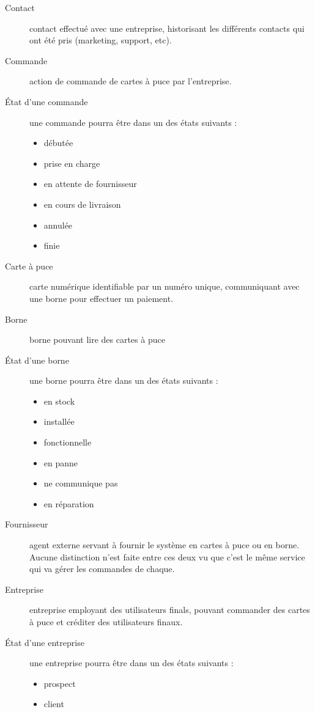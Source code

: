 \begin{description}
  \item[Contact] contact effectué avec une entreprise, historisant les
    différents contacts qui ont été pris (marketing, support, etc).
  \item[Commande] action de commande de cartes à puce par l'entreprise.
  \item[État d'une commande] une commande pourra être dans un des états
    suivants :
    \begin{itemize}
      \item débutée
      \item prise en charge
      \item en attente de fournisseur
      \item en cours de livraison
      \item annulée
      \item finie
    \end{itemize}
  \item[Carte à puce] carte numérique identifiable par un numéro unique,
    communiquant avec une borne pour effectuer un paiement.
  \item[Borne] borne pouvant lire des cartes à puce
  \item[État d'une borne] une borne pourra être dans un des états suivants :
    \begin{itemize}
      \item en stock
      \item installée
      \item fonctionnelle
      \item en panne
      \item ne communique pas
      \item en réparation
    \end{itemize}
  \item[Fournisseur] agent externe servant à fournir le système en cartes à
    puce ou en borne. Aucune distinction n'est faite entre ces deux vu que
    c'est le même service qui va gérer les commandes de chaque.
  \item[Entreprise] entreprise employant des utilisateurs finals, pouvant
    commander des cartes à puce et créditer des utilisateurs finaux.
  \item[État d'une entreprise] une entreprise pourra être dans un des états suivants :
    \begin{itemize}
      \item prospect
      \item client

\end{itemize}
\end{description}
